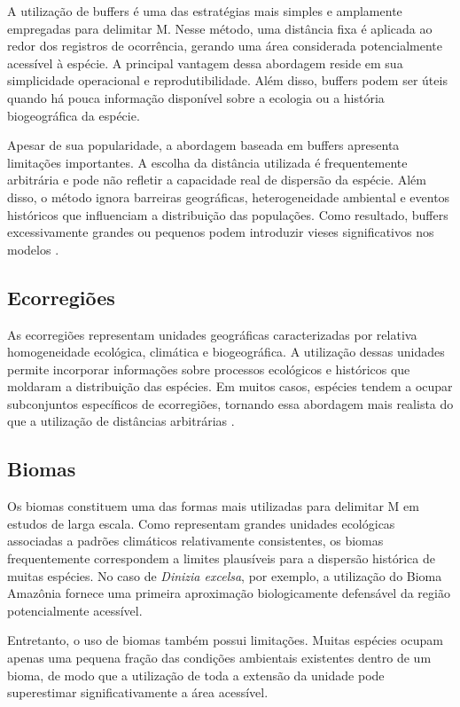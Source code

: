 A utilização de buffers é uma das estratégias mais simples e amplamente empregadas para delimitar M. Nesse método, uma distância fixa é aplicada ao redor dos registros de ocorrência, gerando uma área considerada potencialmente acessível à espécie. A principal vantagem dessa abordagem reside em sua simplicidade operacional e reprodutibilidade. Além disso, buffers podem ser úteis quando há pouca informação disponível sobre a ecologia ou a história biogeográfica da espécie.

Apesar de sua popularidade, a abordagem baseada em buffers apresenta limitações importantes. A escolha da distância utilizada é frequentemente arbitrária e pode não refletir a capacidade real de dispersão da espécie. Além disso, o método ignora barreiras geográficas, heterogeneidade ambiental e eventos históricos que influenciam a distribuição das populações. Como resultado, buffers excessivamente grandes ou pequenos podem introduzir vieses significativos nos modelos \parencite{Barve2011}.

\subsection{Ecorregiões}

As ecorregiões representam unidades geográficas caracterizadas por relativa homogeneidade ecológica, climática e biogeográfica. A utilização dessas unidades permite incorporar informações sobre processos ecológicos e históricos que moldaram a distribuição das espécies. Em muitos casos, espécies tendem a ocupar subconjuntos específicos de ecorregiões, tornando essa abordagem mais realista do que a utilização de distâncias arbitrárias \parencite{Olson2001,Guisan2017}.

\subsection{Biomas}

Os biomas constituem uma das formas mais utilizadas para delimitar M em estudos de larga escala. Como representam grandes unidades ecológicas associadas a padrões climáticos relativamente consistentes, os biomas frequentemente correspondem a limites plausíveis para a dispersão histórica de muitas espécies. No caso de \textit{Dinizia excelsa}, por exemplo, a utilização do Bioma Amazônia fornece uma primeira aproximação biologicamente defensável da região potencialmente acessível.

Entretanto, o uso de biomas também possui limitações. Muitas espécies ocupam apenas uma pequena fração das condições ambientais existentes dentro de um bioma, de modo que a utilização de toda a extensão da unidade pode superestimar significativamente a área acessível.

